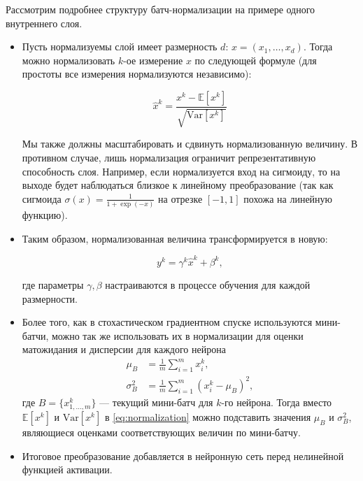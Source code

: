 \documentclass[12pt]{article}
\begin{document}
Рассмотрим подробнее структуру батч-нормализации на примере одного внутреннего слоя.

\begin{itemize}

\item Пусть нормализуемы слой имеет размерность $d$: $x = (x_1, \ldots, x_d)$. Тогда можно нормализовать $k$-ое измерение $x$ по следующей формуле (для простоты все измерения нормализуются независимо):

\begin{equation}\label{eq:normalization}
\hat{x}^k = \frac{x^k - \mathbb{E}[x^k]}{\sqrt{\mathrm{Var}[x^k]}}
\end{equation}

Мы также должны масштабировать и сдвинуть нормализованную величину. В противном случае, лишь нормализация ограничит репрезентативную способность слоя. Например, если нормализуется вход на сигмоиду, то на выходе будет наблюдаться близкое к линейному преобразование (так как сигмоида $\sigma(x) = \frac{1}{1 + \exp(-x)}$ на отрезке $[-1, 1]$ похожа на линейную функцию).

\item Таким образом, нормализованная величина трансформируется в новую:

\begin{equation}
y^k = \gamma^k \hat{x}^k + \beta^k,
\end{equation}

где параметры $\gamma, \beta$ настраиваются в процессе обучения для каждой размерности.

\item 
Более того, как в стохастическом градиентном спуске используются мини-батчи, можно так же использовать их в нормализации для оценки матожидания и дисперсии для каждого нейрона
\begin{equation}
\begin{aligned}
\mu_B &= \frac{1}{m} \sum_{i=1}^m x^k_i, \\
\sigma_B^2 &= \frac{1}{m} \sum_{i=1}^m (x^k_i - \mu_B)^2,
\end{aligned}
\end{equation}
где $B = \{x^k_{1, \ldots, m}\}$ --- текущий мини-батч для $k$-го нейрона. Тогда вместо $\mathbb{E}[x^k]$ и $\mathrm{Var}[x^k]$ в \eqref{eq:normalization} можно подставить значения $\mu_B$ и $\sigma_B^2$, являющиеся оценками соответствующих величин по мини-батчу.

\item Итоговое преобразование добавляется в нейронную сеть перед нелинейной функцией активации.
\end{itemize}
\end{document}
